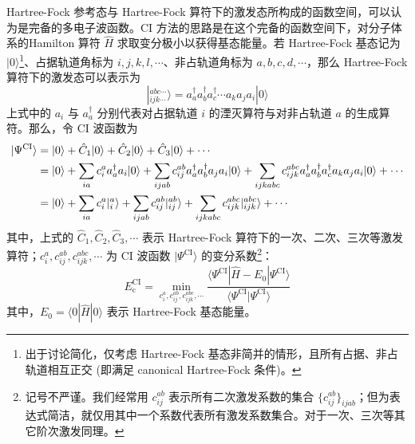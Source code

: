 Hartree-Fock 参考态与 Hartree-Fock 算符下的激发态所构成的函数空间，可以认为是完备的多电子波函数。CI 方法的思路是在这个完备的函数空间下，对分子体系的Hamilton 算符 $\hat H$ 求取变分极小以获得基态能量。若 Hartree-Fock 基态记为 $| 0 \rangle$\footnote{出于讨论简化，仅考虑 Hartree-Fock 基态非简并的情形，且所有占据、非占轨道相互正交 (即满足 canonical Hartree-Fock 条件)。}、占据轨道角标为 $i, j, k, l, \cdots$、非占轨道角标为 $a, b, c, d, \cdots$，那么 Hartree-Fock 算符下的激发态可以表示为
\begin{equation}
  | {}_{ijk\cdots}^{abc\cdots} \rangle = a_a^\dagger a_b^\dagger a_c^\dagger \cdots a_k a_j a_i | 0 \rangle
\end{equation}
上式中的 $a_i$ 与 $a_a^\dagger$ 分别代表对占据轨道 $i$ 的湮灭算符与对非占轨道 $a$ 的生成算符。那么，令 CI 波函数为
\begin{align}
  | \Psi^\text{CI} \rangle &= | 0 \rangle + \hat C_1 | 0 \rangle + \hat C_2 | 0 \rangle + \hat C_3 | 0 \rangle + \cdots \notag\\
  &= | 0 \rangle + \sum_{ia} c_i^a a_a^\dagger a_i | 0 \rangle + \sum_{ijab} c_{ij}^{ab} a_a^\dagger a_b^\dagger a_j a_i | 0 \rangle + \sum_{ijkabc} c_{ijk}^{abc} a_a^\dagger a_b^\dagger a_c^\dagger a_k a_j a_i | 0 \rangle + \cdots \notag\\
  &= | 0 \rangle + \sum_{ia} c_i^a | {}_i^a \rangle + \sum_{ijab} c_{ij}^{ab} | {}_{ij}^{ab} \rangle  + \sum_{ijkabc} c_{ijk}^{abc} | {}_{ijk}^{abc} \rangle + \cdots
\end{align}
其中，上式的 $\hat C_1, \hat C_2, \hat C_3, \cdots$ 表示 Hartree-Fock 算符下的一次、二次、三次等激发算符；$c_i^a, c_{ij}^{ab}, c_{ijk}^{abc}, \cdots$ 为 CI 波函数 $| \Psi^\text{CI} \rangle$ 的变分系数\footnote{记号不严谨。我们经常用 $c_{ij}^{ab}$ 表示所有二次激发系数的集合 $\{ c_{ij}^{ab} \}_{ijab}$；但为表达式简洁，就仅用其中一个系数代表所有激发系数集合。对于一次、三次等其它阶次激发同理。}：
\begin{equation}
  \label{eq.2.CI-variation}
  E_\mathrm{c}^\mathrm{CI} = \min_{c_i^a, c_{ij}^{ab}, c_{ijk}^{abc}, \cdots} \frac{\langle \Psi^\mathrm{CI} | \hat H - E_0 | \Psi^\mathrm{CI} \rangle}{\langle \Psi^\mathrm{CI} | \Psi^\mathrm{CI} \rangle}
\end{equation}
其中，$E_0 = \langle 0 | \hat H | 0 \rangle$ 表示 Hartree-Fock 基态能量。

